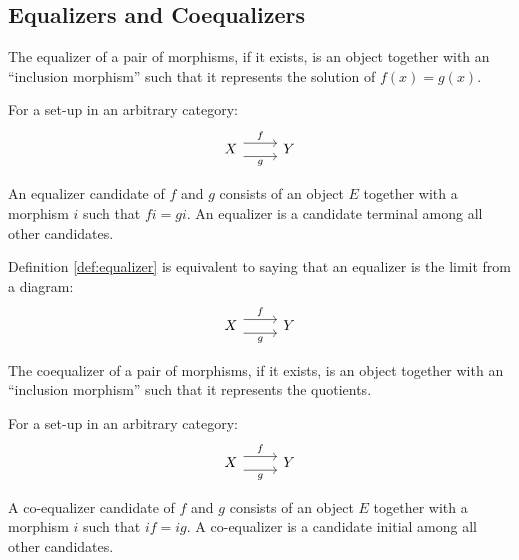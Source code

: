 \subsection{Equalizers and Coequalizers}
The equalizer of a pair of morphisms, if it exists, is an object together with
an ``inclusion morphism'' such that it represents the solution of $f(x)=g(x)$.

\begin{definition}
  For a set-up in an arbitrary category:
  \[\begin{tikzcd}[ampersand replacement=\&]
    X \& Y
    \arrow["f", shift left=2, from=1-1, to=1-2]
    \arrow["g"', shift right=2, from=1-1, to=1-2]
  \end{tikzcd}\]

  An equalizer candidate of $f$ and $g$ consists of an object $E$ together with
  a morphism $i$ such that $fi = gi$.
  \parencite{leinster:basic_category_theory}
  An equalizer is a candidate terminal among all other candidates.
\end{definition}

\begin{definition}
  Definition \ref{def:equalizer} is equivalent to saying that an equalizer is
  the limit from a diagram:
  \[\begin{tikzcd}[ampersand replacement=\&]
    X \& Y
    \arrow["f", shift left=2, from=1-1, to=1-2]
    \arrow["g"', shift right=2, from=1-1, to=1-2]
  \end{tikzcd}\]
\end{definition}

The coequalizer of a pair of morphisms, if it exists, is an object together with
an ``inclusion morphism'' such that it represents the quotients.

\begin{definition}
  For a set-up in an arbitrary category:
  \[\begin{tikzcd}[ampersand replacement=\&]
    X \& Y
    \arrow["f", shift left=2, from=1-1, to=1-2]
    \arrow["g"', shift right=2, from=1-1, to=1-2]
  \end{tikzcd}\]

  A co-equalizer candidate of $f$ and $g$ consists of an object $E$ together
  with a morphism $i$ such that $if = ig$.
  \parencite{leinster:basic_category_theory}
  A co-equalizer is a candidate initial among all other candidates.
\end{definition}